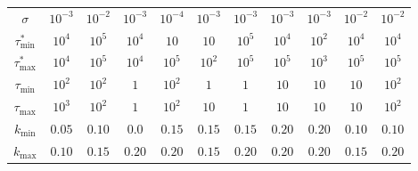 \begin{table*}[htb]
\begin{tabular}{c||c|c|c|c|c||c|c|c|c|c}
        $\sigma$                          & $10^{-3}$                             & $10^{-2}$                           & $10^{-3}$                & $10^{-4}$                & $10^{-3}$     & $10^{-3}$   & $10^{-3}$    & $10^{-3}$     & $10^{-2}$     & $10^{-2}$     \\
        $\tau^{*}_{\mathrm{min}}$         & $10^4$                                & $10^5$                              & $10^4$                   & $10$                     & $10$          & $10^5$      & $10^4$       & $10^2$        & $10^4$        & $10^4$        \\
        $\tau^{*}_{\mathrm{max}}$         & $10^4$                                & $10^5$                              & $10^4$                   & $10^5$                   & $10^2$        & $10^5$      & $10^5$       & $10^3$        & $10^5$        & $10^5$        \\
        $\tau_{\mathrm{min}}$             & $10^2$                                & $10^2$                              & $1$                      & $10^2$                   & $1$           & $1$         & $10$         & $10$          & $10$          & $10^2$        \\
        $\tau_{\mathrm{max}}$             & $10^3$                                & $10^2$                              & $1$                      & $10^2$                   & $10$          & $1$         & $10$         & $10$          & $10$          & $10^2$        \\
        $k_{\mathrm{min}}$                & $0.05$                                & $0.10$                              & $0.0$                    & $0.15$                   & $0.15$        & $0.15$      & $0.20$       & $0.20$        & $0.10$        & $0.10$        \\
        $k_{\mathrm{max}}$                & $0.10$                                & $0.15$                              & $0.20$                   & $0.20$                   & $0.15$        & $0.20$      & $0.20$       & $0.20$        & $0.15$        & $0.20$        \\
    \end{tabular}
\end{table*}
